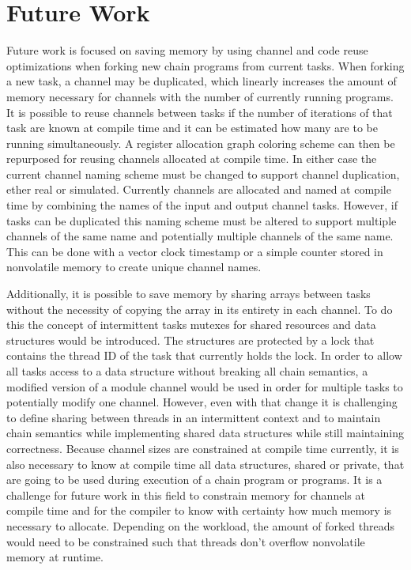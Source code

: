 \documentclass[11pt]{sensys-proc}
\begin{document}
\section{Future Work}
Future work is focused on saving memory by using channel and code reuse
optimizations when forking new chain programs from current tasks.  When forking
a new task, a channel may be duplicated, which linearly increases the amount of
memory necessary for channels with the number of currently running programs.  It
is possible to reuse channels between tasks if the number of iterations of that
task are known at compile time and it can be estimated how many are to be
running simultaneously. A register allocation graph coloring scheme can then be
repurposed for reusing channels allocated at compile time.  In either case the
current channel naming scheme must be changed to support channel duplication,
ether real or simulated.  Currently channels are allocated and named at compile
time by combining the names of the input and output channel tasks.  However, if
tasks can be duplicated this naming scheme must be altered to support multiple
channels of the same name and potentially multiple channels of the same name.
This can be done with a vector clock timestamp or a simple counter stored in
nonvolatile memory to create unique channel names.

Additionally, it is possible to save memory by sharing arrays between tasks
without the necessity of copying the array in its entirety in each channel.  To
do this the concept of intermittent tasks mutexes for shared resources and data
structures would be introduced.  The structures are protected by a lock that
contains the thread ID of the task that currently holds the lock.  In order to
allow all tasks access to a data structure without breaking all chain semantics,
a modified version of a module channel would be used in order for multiple tasks
to potentially modify one channel.  However, even with that change it is
challenging to define sharing between threads in an intermittent context and to
maintain chain semantics while implementing shared data structures while still
maintaining correctness.  Because channel sizes are constrained at compile time
currently, it is also necessary to know at compile time all data structures,
shared or private, that are going to be used during execution of a chain program
or programs.  It is a challenge for future work in this field to constrain
memory for channels at compile time and for the compiler to know with certainty
how much memory is necessary to allocate. Depending on the workload, the amount
of forked threads would need to be constrained such that threads don't overflow
nonvolatile memory at runtime.
\end{document}
